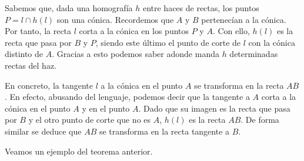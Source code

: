 \begin{obs}
	\label{C8_homografia_Steiner_tangentes}
	Sabemos que, dada una homografía $h$ entre haces de rectas, los puntos $P=l\cap h(l)$ son una cónica. Recordemos que $A$ y $B$ pertenecían a la cónica. Por tanto, la recta $l$ corta a la cónica en los puntos $P$ y $A$. Con ello,  $h(l)$ es la recta que pasa por $B$ y $P$, siendo este último el punto de corte de $l$ con la cónica distinto de $A$. Gracias a esto podemos saber adonde manda $h$ determinadas rectas del haz. 
	
	En concreto, la tangente $l$ a la cónica en el punto $A$ se transforma en la recta $AB$. En efecto, abusando del lenguaje, podemos decir que la tangente a $A$ corta a la cónica en el punto $A$ y en el punto $A$. Dado que su imagen es la recta que pasa por $B$ y el otro punto de corte que no es $A$, $h(l)$ es la recta $AB$. De forma similar se deduce que $AB$ se transforma en la recta tangente a $B$.
\end{obs}
Veamos un ejemplo del teorema anterior.

